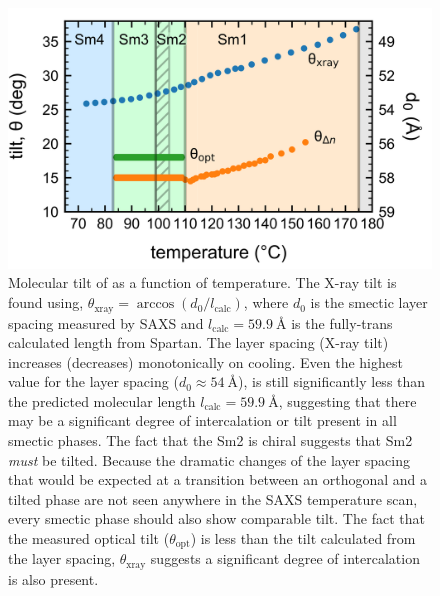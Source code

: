 \documentclass[superscriptaddress,floatfix,onecolumn,notitlepage]{revtex4-1}
\begin{document}
\begin{figure}[H]
    \centering
    \includegraphics[width=.7\textwidth]{tilt-master.png}

    \caption{Molecular tilt of  as a function of temperature. The
        X-ray tilt is found using, $\theta_\text{xray} =
        \arccos(d_0/l_\text{calc})$, where $d_0$ is the smectic
        layer spacing measured by SAXS and $l_\text{calc} =
        \SI{59.9}{\angstrom}$ is the fully-trans calculated
    length from Spartan. The layer
    spacing (X-ray tilt) increases (decreases) monotonically on cooling.
Even the highest value for the
    layer spacing ($d_0\approx \SI{54}{\angstrom}$), is still significantly less than the
    predicted molecular length $l_\text{calc}=\SI{59.9}{\angstrom}$, suggesting
    that there may be a significant
    degree of intercalation or tilt present in all smectic phases. The fact that
    the Sm2 is chiral
    suggests that Sm2 \textit{must} be tilted. Because the dramatic
    changes of the layer spacing that would be expected at a transition between
    an orthogonal and a tilted phase are not seen anywhere in the SAXS
    temperature scan, every smectic phase should also show comparable tilt.
The fact that the measured optical tilt ($\theta_\text{opt}$) is less than
    the tilt calculated from the layer spacing, $\theta_\text{xray}$ suggests a significant degree of
    intercalation is also present.}
\end{figure}
\end{document}

